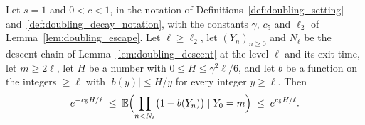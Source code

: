 \begin{lemma}\label{lem:doubling_product}
Let $s=1$ and $0<c<1$, in the notation of Definitions~\ref{def:doubling_setting}
and~\ref{def:doubling_decay_notation}, with the
constants $\gamma$, $c_5$ and $\ell_2$ of Lemma~\ref{lem:doubling_escape}. Let
$\ell\geq\ell_2$, let $(Y_n)_{n\geq0}$ and $N_\ell$ be the descent chain of
Lemma~\ref{lem:doubling_descent} at the level $\ell$ and its exit time,
let $m\geq2\ell$, let $H$ be a number with $0\leq H\leq\gamma^2\ell/6$, and let $b$ be a
function on the integers $\geq\ell$ with $|b(y)|\leq H/y$ for every integer $y\geq\ell$. Then
\begin{equation}\label{eq:doubling_product}
    e^{-c_5H/\ell}\;\leq\;
    \mathbb E\Bigl(\prod_{n<N_\ell}\bigl(1+b(Y_n)\bigr)\mid Y_0=m\Bigr)\;\leq\;e^{c_5H/\ell} .
\end{equation}
\end{lemma}


